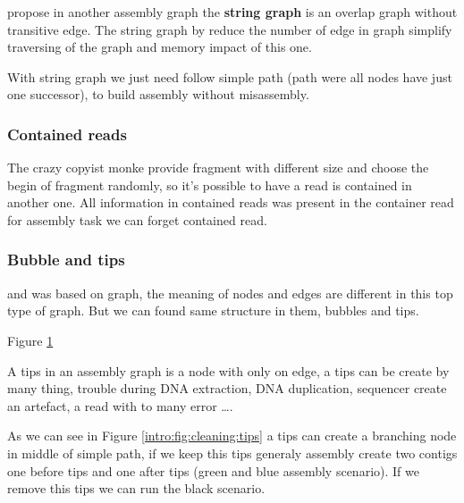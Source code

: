 \documentclass[./main.tex]{subfiles}
\begin{document}
\citeauthor{string_graph} propose in \cite{string_graph} another assembly graph the \textbf{string graph} is an overlap graph without transitive edge. The string graph by reduce the number of edge in graph simplify traversing of the graph and memory impact of this one.

With string graph we just need follow simple path (path were all nodes have just one successor), to build assembly without misassembly.

\subsubsection{Contained reads}

The crazy copyist monke provide fragment with different size and choose the begin of fragment randomly, so it's possible to have a read is contained in another one. All information in contained reads was present in the container read for assembly task we can forget contained read.

\subsubsection{Bubble and tips}

\OLC and \DBG was based on graph, the meaning of nodes and edges are different in this top type of graph. But we can found same structure in them, bubbles and tips.

Figure \ref{intro:fig:cleaning}

\begin{figure}[ht]
    \caption{}
    \label{intro:fig:cleaning}
\end{figure}

A tips in an assembly graph is a node with only on edge, a tips can be create by many thing, trouble during DNA extraction, DNA duplication, sequencer create an artefact, a read with to many error ….

As we can see in Figure \ref{intro:fig:cleaning:tips} a tips can create a branching node in middle of simple path, if we keep this tips generaly assembly create two contigs one before tips and one after tips (green and blue assembly scenario). If we remove this tips we can run the black scenario.
\end{document}

